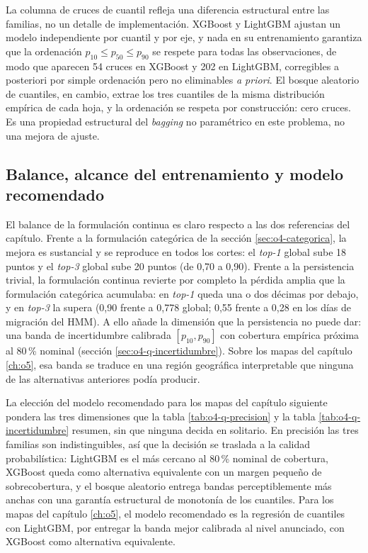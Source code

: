 La columna de cruces de cuantil refleja una diferencia estructural entre las
familias, no un detalle de implementación. XGBoost y LightGBM ajustan un modelo
independiente por cuantil y por eje, y nada en su entrenamiento garantiza que la
ordenación $p_{10} \leq p_{50} \leq p_{90}$ se respete para todas las observaciones,
de modo que aparecen 54 cruces en XGBoost y 202 en LightGBM, corregibles a
posteriori por simple ordenación pero no eliminables \emph{a priori}. El bosque
aleatorio de cuantiles, en cambio, extrae los tres cuantiles de la misma
distribución empírica de cada hoja, y la ordenación se respeta por construcción:
cero cruces. Es una propiedad estructural del \textit{bagging} no paramétrico en
este problema, no una mejora de ajuste.

\subsection{Balance, alcance del entrenamiento y modelo recomendado}
\label{sec:o4-q-cierre}

El balance de la formulación continua es claro respecto a las dos referencias del
capítulo. Frente a la formulación categórica de la sección \ref{sec:o4-categorica},
la mejora es sustancial y se reproduce en todos los cortes: el \textit{top-1} global
sube 18 puntos y el \textit{top-3} global sube 20 puntos (de 0,70 a 0,90). Frente
a la persistencia trivial, la formulación continua revierte por completo la pérdida
amplia que la formulación categórica acumulaba: en \textit{top-1} queda una o dos
décimas por debajo, y en \textit{top-3} la supera (0,90 frente a 0,778 global;
0,55 frente a 0,28 en los días de migración del HMM). A ello añade la dimensión
que la persistencia no puede dar: una banda de incertidumbre calibrada $[p_{10},
p_{90}]$ con cobertura empírica próxima al 80\,\% nominal
(sección \ref{sec:o4-q-incertidumbre}). Sobre los mapas del capítulo
\ref{ch:o5}, esa banda se traduce en una región geográfica interpretable que
ninguna de las alternativas anteriores podía producir.

La elección del modelo recomendado para los mapas del capítulo siguiente pondera
las tres dimensiones que la tabla \ref{tab:o4-q-precision} y la tabla
\ref{tab:o4-q-incertidumbre} resumen, sin que ninguna decida en solitario. En
precisión las tres familias son indistinguibles, así que la decisión se traslada a
la calidad probabilística: LightGBM es el más cercano al 80\,\% nominal de
cobertura, XGBoost queda como alternativa equivalente con un margen pequeño de
sobrecobertura, y el bosque aleatorio entrega bandas perceptiblemente más anchas
con una garantía estructural de monotonía de los cuantiles. Para los mapas del
capítulo \ref{ch:o5}, el modelo recomendado es la regresión de cuantiles con
LightGBM, por entregar la banda mejor calibrada al nivel anunciado, con XGBoost
como alternativa equivalente.

